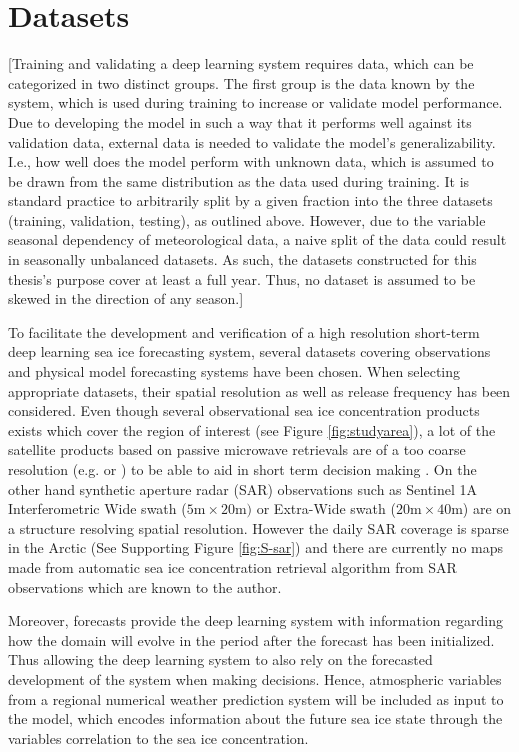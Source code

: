 \documentclass[../main/thesis.tex]{subfiles}
\begin{document}
\section{Datasets}
[Training and validating a deep learning system requires data, which can be categorized in two distinct groups. The first group is the data known by the system, which is used during training to increase or validate model performance. Due to developing the model in such a way that it performs well against its validation data, external data is needed to validate the model's generalizability. I.e., how well does the model perform with unknown data, which is assumed to be drawn from the same distribution as the data used during training. It is standard practice to arbitrarily split by a given fraction into the three datasets (training, validation, testing), as outlined above. However, due to the variable seasonal dependency of meteorological data, a naive split of the data could result in seasonally unbalanced datasets. As such, the datasets constructed for this thesis's purpose cover at least a full year. Thus, no dataset is assumed to be skewed in the direction of any season.] 

To facilitate the development and verification of a high resolution short-term deep learning sea ice forecasting system, several datasets covering observations and physical model forecasting systems have been chosen. When selecting appropriate datasets, their spatial resolution as well as release frequency has been considered. Even though several observational sea ice concentration products exists which cover the region of interest (see Figure \ref{fig:studyarea}), a lot of the satellite products based on passive microwave retrievals are of a too coarse resolution (e.g. \citet{Lavergne2019} or \citet{Kern2019}) to be able to aid in short term decision making \citep{Wagner2020}. On the other hand synthetic aperture radar (SAR) observations such as Sentinel 1A Interferometric Wide swath ($5\text{m} \times 20\text{m})$ or Extra-Wide swath ($20\text{m} \times 40\text{m}$) are on a structure resolving spatial resolution. However the daily SAR coverage is sparse in the Arctic (See Supporting Figure \ref{fig:S-sar}) and there are currently no maps made from automatic sea ice concentration retrieval algorithm from SAR observations which are known to the author.

Moreover, forecasts provide the deep learning system with information regarding how the domain will evolve in the period after the forecast has been initialized. Thus allowing the deep learning system to also rely on the forecasted development of the system when making decisions. Hence, atmospheric variables from a regional numerical weather prediction system will be included as input to the model, which encodes information about the future sea ice state through the variables correlation to the sea ice concentration.
\end{document}
